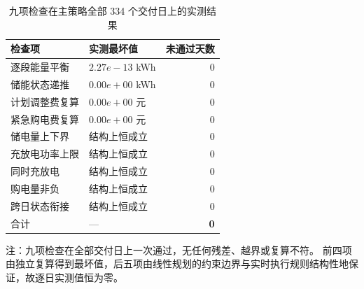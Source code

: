 \begin{table}[htbp]
  \centering
  \caption{九项检查在主策略全部 334 个交付日上的实测结果}
  \label{tab:p3-check}
  \small
  \begin{tabular}{llr}
    \toprule
    检查项 & 实测最坏值 & 未通过天数 \\
    \midrule
    逐段能量平衡 & $2.27e-13$ kWh & 0 \\
    储能状态递推 & $0.00e+00$ kWh & 0 \\
    计划调整费复算 & $0.00e+00$ 元 & 0 \\
    紧急购电费复算 & $0.00e+00$ 元 & 0 \\
    储电量上下界 & 结构上恒成立 & 0 \\
    充放电功率上限 & 结构上恒成立 & 0 \\
    同时充放电 & 结构上恒成立 & 0 \\
    购电量非负 & 结构上恒成立 & 0 \\
    跨日状态衔接 & 结构上恒成立 & 0 \\
    \midrule
    合计 & --- & \textbf{0} \\
    \bottomrule
  \end{tabular}
  \par\vspace{2pt}
  \begin{minipage}{\textwidth}\footnotesize
    注：九项检查在全部交付日上一次通过，无任何残差、越界或复算不符。
    前四项由独立复算得到最坏值，后五项由线性规划的约束边界与实时执行规则结构性地保证，故逐日实测值恒为零。
  \end{minipage}
\end{table}
